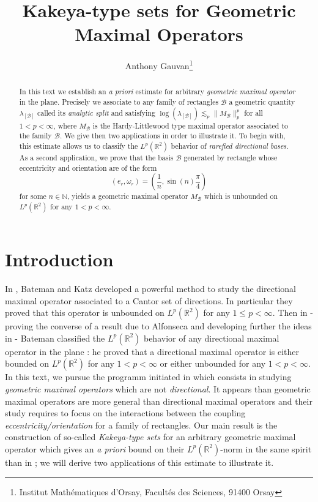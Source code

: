 \documentclass{article}
\title{\textbf{Kakeya-type sets for Geometric Maximal Operators}}
\author{Anthony Gauvan\footnote{Institut Mathématiques d'Orsay, Facultés des Sciences, 91400 Orsay}}
\begin{document}
\maketitle







\begin{abstract}
In this text we establish an \textit{a priori} estimate for arbitrary \textit{geometric maximal operator} in the plane. Precisely we associate to any family of rectangles $\mathcal{B}$ a geometric quantity $\lambda_{[\mathcal{B}]}$ called its \textit{analytic split} and satisfying $\log( \lambda_{[\mathcal{B}]}) \lesssim_p \| M_{\mathcal{B}} \|_p^p$ for all $1 < p < \infty$, where $M_\mathcal{B}$ is the Hardy-Littlewood type maximal operator associated to the family $\mathcal{B}$. We give then two applications in order to illustrate it. To begin with, this estimate allows us to classify the $L^p(\mathbb{R}^2)$ behavior of \textit{rarefied directional bases}. As a second application, we prove that the basis $\mathcal{B}$ generated by rectangle whose eccentricity and orientation are of the form $$\left( e_r, \omega_r \right) = \left( \frac{1}{n} , \sin(n) \frac{\pi}{4} \right) $$ for some $n \in \mathbb{N}$, yields a geometric maximal operator $M_\mathcal{B}$ which is unbounded on $L^p(\mathbb{R}^2)$ for any $1 < p < \infty$.
\end{abstract}





\section{Introduction}

In \cite{BATEMANKATZ}, Bateman and Katz developed a powerful method to study the directional maximal operator associated to a Cantor set of directions. In particular they proved that this operator is unbounded on $L^p(\mathbb{R}^2)$ for any $1 \leq p < \infty$. Then in \cite{BATEMAN} - proving the converse of a result due to Alfonseca \cite{ALFONSECA} and developing further the ideas in \cite{BATEMANKATZ} - Bateman classified the $L^p(\mathbb{R}^2)$ behavior of any directional maximal operator in the plane : he proved that a directional maximal operator is either bounded on $L^p(\mathbb{R}^2)$ for any $1 < p < \infty$ or either unbounded for any $1 < p < \infty$. In this text, we pursue the programm initiated in \cite{GAUVAN} which consists in studying \textit{geometric maximal operators} which are not \textit{directional}. It appears than geometric maximal operators are more general than directional maximal operators and their study requires to focus on the interactions between the coupling \textit{eccentricity/orientation} for a family of rectangles. Our main result is the construction of so-called \textit{Kakeya-type sets} for an arbitrary geometric maximal operator which gives an \textit{a priori} bound on their $L^p(\mathbb{R}^2)$-norm in the same spirit than in \cite{BATEMAN} ; we will derive two applications of this estimate to illustrate it.
\end{document}

